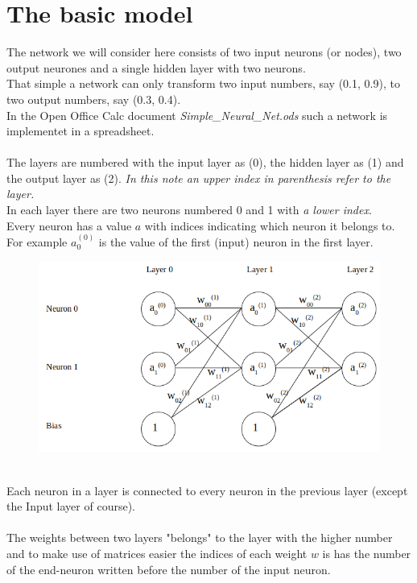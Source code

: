 \documentclass{article}
\begin{document}
\section*{The basic model}
The network we will consider here consists of two input neurons (or nodes), two output neurones and a single hidden layer with two neurons.
\\
That simple a network can only transform two input numbers, say (0.1, 0.9), to two output numbers, say (0.3, 0.4).
\\
In the Open Office Calc document \textit{Simple\_Neural\_Net.ods} such a network is implementet in a spreadsheet.
\\
\\
The layers are numbered with the input layer as (0), the hidden layer as (1) and the output layer as (2). \textit{In this note an upper index in parenthesis refer to the layer.}
\\
In each layer there are two neurons numbered 0 and 1 with \textit{a lower index}.
\\
Every neuron has a value $a$ with indices indicating which neuron it belongs to.
\\
For example $a_0^{(0)}$ is the value of the first (input) neuron in the first layer.
\begin{figure}[h]
\includegraphics[scale=.4]{two_neuron_net}
\centering
\end{figure}
\\
Each neuron in a layer is connected to every neuron in the previous layer (except the Input layer of course).\\
\\
The weights between two layers "belongs" to the layer with the higher number and to make use of matrices easier the indices of each weight $w$ is has the number of the end-neuron written before the number of the input neuron.
\end{document}

